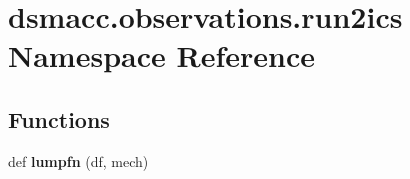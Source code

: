 \hypertarget{namespacedsmacc_1_1observations_1_1run2ics}{}\section{dsmacc.\+observations.\+run2ics Namespace Reference}
\label{namespacedsmacc_1_1observations_1_1run2ics}
\subsection*{Functions}
\begin{DoxyCompactItemize}
\item 
\mbox{\label{namespacedsmacc_1_1observations_1_1run2ics_abe3c37ef6b47eda01a6165ddfb38e88d}} 
def {\bfseries lumpfn} (df, mech)
\item 

\end{DoxyCompactItemize}
